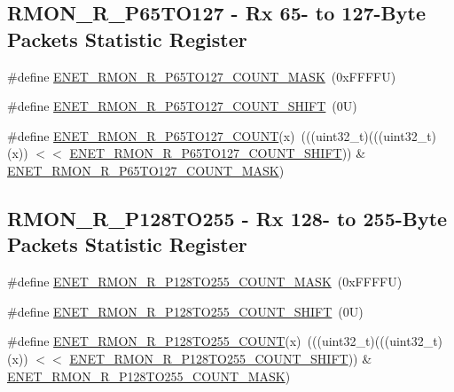 \subsection*{R\+M\+O\+N\+\_\+\+R\+\_\+\+P65\+T\+O127 -\/ Rx 65-\/ to 127-\/\+Byte Packets Statistic Register}
\begin{DoxyCompactItemize}
\item 
\#define \mbox{\hyperlink{group___e_n_e_t___register___masks_ga2a632b9df359a8efad215ab90dc33157}{E\+N\+E\+T\+\_\+\+R\+M\+O\+N\+\_\+\+R\+\_\+\+P65\+T\+O127\+\_\+\+C\+O\+U\+N\+T\+\_\+\+M\+A\+SK}}~(0x\+F\+F\+F\+F\+U)
\item 
\#define \mbox{\hyperlink{group___e_n_e_t___register___masks_gac93f4bae8a600e98833a132aa02065a0}{E\+N\+E\+T\+\_\+\+R\+M\+O\+N\+\_\+\+R\+\_\+\+P65\+T\+O127\+\_\+\+C\+O\+U\+N\+T\+\_\+\+S\+H\+I\+FT}}~(0\+U)
\item 
\#define \mbox{\hyperlink{group___e_n_e_t___register___masks_ga38f2ba6958a5e0b6b5b4d147037e0c78}{E\+N\+E\+T\+\_\+\+R\+M\+O\+N\+\_\+\+R\+\_\+\+P65\+T\+O127\+\_\+\+C\+O\+U\+NT}}(x)~(((uint32\+\_\+t)(((uint32\+\_\+t)(x)) $<$$<$ \mbox{\hyperlink{group___e_n_e_t___register___masks_gac93f4bae8a600e98833a132aa02065a0}{E\+N\+E\+T\+\_\+\+R\+M\+O\+N\+\_\+\+R\+\_\+\+P65\+T\+O127\+\_\+\+C\+O\+U\+N\+T\+\_\+\+S\+H\+I\+FT}})) \& \mbox{\hyperlink{group___e_n_e_t___register___masks_ga2a632b9df359a8efad215ab90dc33157}{E\+N\+E\+T\+\_\+\+R\+M\+O\+N\+\_\+\+R\+\_\+\+P65\+T\+O127\+\_\+\+C\+O\+U\+N\+T\+\_\+\+M\+A\+SK}})
\end{DoxyCompactItemize}
\subsection*{R\+M\+O\+N\+\_\+\+R\+\_\+\+P128\+T\+O255 -\/ Rx 128-\/ to 255-\/\+Byte Packets Statistic Register}
\begin{DoxyCompactItemize}
\item 
\#define \mbox{\hyperlink{group___e_n_e_t___register___masks_ga2d2913a282b447ccbf47ab61daa15197}{E\+N\+E\+T\+\_\+\+R\+M\+O\+N\+\_\+\+R\+\_\+\+P128\+T\+O255\+\_\+\+C\+O\+U\+N\+T\+\_\+\+M\+A\+SK}}~(0x\+F\+F\+F\+F\+U)
\item 
\#define \mbox{\hyperlink{group___e_n_e_t___register___masks_gad89a09873f7fb8686264696f1bf396ea}{E\+N\+E\+T\+\_\+\+R\+M\+O\+N\+\_\+\+R\+\_\+\+P128\+T\+O255\+\_\+\+C\+O\+U\+N\+T\+\_\+\+S\+H\+I\+FT}}~(0\+U)
\item 
\#define \mbox{\hyperlink{group___e_n_e_t___register___masks_gab372fe7172a4f45b6c4213ba33fbc596}{E\+N\+E\+T\+\_\+\+R\+M\+O\+N\+\_\+\+R\+\_\+\+P128\+T\+O255\+\_\+\+C\+O\+U\+NT}}(x)~(((uint32\+\_\+t)(((uint32\+\_\+t)(x)) $<$$<$ \mbox{\hyperlink{group___e_n_e_t___register___masks_gad89a09873f7fb8686264696f1bf396ea}{E\+N\+E\+T\+\_\+\+R\+M\+O\+N\+\_\+\+R\+\_\+\+P128\+T\+O255\+\_\+\+C\+O\+U\+N\+T\+\_\+\+S\+H\+I\+FT}})) \& \mbox{\hyperlink{group___e_n_e_t___register___masks_ga2d2913a282b447ccbf47ab61daa15197}{E\+N\+E\+T\+\_\+\+R\+M\+O\+N\+\_\+\+R\+\_\+\+P128\+T\+O255\+\_\+\+C\+O\+U\+N\+T\+\_\+\+M\+A\+SK}})
\end{DoxyCompactItemize}
